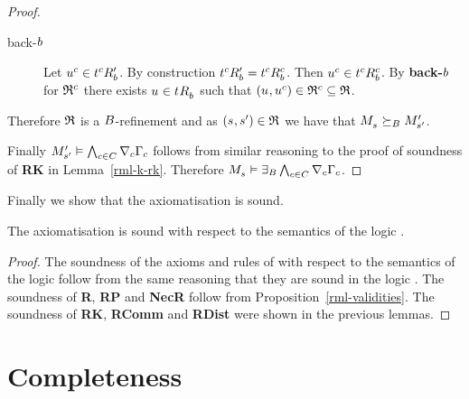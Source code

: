 \begin{proof}
\begin{description}
\begin{description}
            \item[back-$\agentB$]
                Let $\kStateU[\agentC] \in \kSuccessorsPB{\kStateT[\agentC]}$.
                By construction $\kSuccessorsPB{\kStateT[\agentC]} = \kSuccessorsB[\agentC]{\kStateT[\agentC]}$.
                Then $\kStateU[\agentC] \in \kSuccessorsB[\agentC]{\kStateT[\agentC]}$.
                By {\bf back-$\agentB$} for $\refinement^\agentC$ there exists $\kStateU \in \kSuccessorsB{\kStateT}$ such that $(\kStateU, \kStateU[\agentC]) \in \refinement^\agentC \subseteq \refinement$.
        \end{description}
\end{description}

Therefore $\refinement$ is a $\agentsB$-refinement and as $(\kStateS, \kStateSP) \in \refinement$ we have that $\kPModel{\kStateS} \simulatesBs \kPModelP{\kStateSP}$.

Finally $\kPModelP{\kStateSP} \entails \bigwedge_{\agentC \in \agentsC} \coversC \Gamma_\agentC$ follows from similar reasoning to the proof of soundness of {\bf RK} in Lemma~\ref{rml-k-rk}.
Therefore $\kPModel{\kStateS} \entails \somerefsBs \bigwedge_{\agentC \in \agentsC} \coversC \Gamma_\agentC$.
\end{proof}

Finally we show that the axiomatisation \axiomRmlK{} is sound.

\begin{lemma}\label{rml-k-sound}
The axiomatisation \axiomRmlK{} is sound with respect to the semantics of the logic \logicRmlK{}.
\end{lemma}

\begin{proof}
The soundness of the axioms and rules of \axiomK{} with respect to the semantics of the logic \logicRmlK{} follow from the same reasoning that they are sound in the logic \logicK{}.
The soundness of {\bf R}, {\bf RP} and {\bf NecR} follow from Proposition~\ref{rml-validities}.
The soundness of {\bf RK}, {\bf RComm} and {\bf RDist} were shown in the previous lemmas.
\end{proof}

\section{Completeness}\label{rml-k-completeness}

